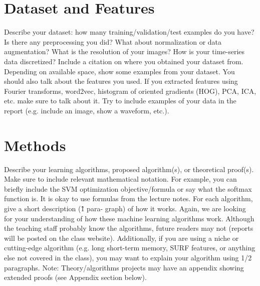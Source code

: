 \documentclass{article}
\begin{document}
\section{Dataset and Features}
Describe your dataset: how many training/validation/test examples do you have? Is there any preprocessing you did? What about normalization or data augmentation? What is the resolution of your images? How is your time-series data discretized? Include a citation on where you obtained your dataset from. Depending on available space, show some examples from your dataset. You should also talk about the features you used. If you extracted features using Fourier transforms, word2vec, histogram of oriented gradients (HOG), PCA, ICA, etc. make sure to talk about it. Try to include examples of your data in the report (e.g. include an image, show a waveform, etc.).

\section{Methods}
Describe your learning algorithms, proposed algorithm(s), or theoretical proof(s). Make sure to include relevant mathematical notation. For example, you can briefly include the SVM optimization objective/formula or say what the softmax function is. It is okay to use formulas from the lecture notes. For each algorithm, give a short description (\~ 1 para- graph) of how it works. Again, we are looking for your understanding of how these machine learning algorithms work. Although the teaching staff probably know the algorithms, future readers may not (reports will be posted on the class website). Additionally, if you are using a niche or cutting-edge algorithm (e.g. long short-term memory, SURF features, or anything else not covered in the class), you may want to explain your algorithm using 1/2 paragraphs. Note: Theory/algorithms projects may have an appendix showing extended proofs (see Appendix section below).
\end{document}
